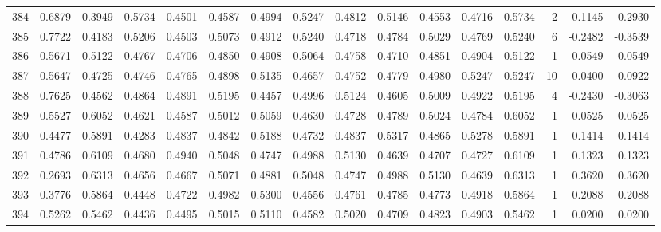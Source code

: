 \begin{tabular}{lrrrrrrrrrrrrrrr}
384 &      0.6879 &  0.3949 &  0.5734 &  0.4501 &  0.4587 &  0.4994 &  0.5247 &  0.4812 &  0.5146 &  0.4553 &   0.4716 &     0.5734 &      2 &                   -0.1145 &                    -0.2930 \\
385 &      0.7722 &  0.4183 &  0.5206 &  0.4503 &  0.5073 &  0.4912 &  0.5240 &  0.4718 &  0.4784 &  0.5029 &   0.4769 &     0.5240 &      6 &                   -0.2482 &                    -0.3539 \\
386 &      0.5671 &  0.5122 &  0.4767 &  0.4706 &  0.4850 &  0.4908 &  0.5064 &  0.4758 &  0.4710 &  0.4851 &   0.4904 &     0.5122 &      1 &                   -0.0549 &                    -0.0549 \\
387 &      0.5647 &  0.4725 &  0.4746 &  0.4765 &  0.4898 &  0.5135 &  0.4657 &  0.4752 &  0.4779 &  0.4980 &   0.5247 &     0.5247 &     10 &                   -0.0400 &                    -0.0922 \\
388 &      0.7625 &  0.4562 &  0.4864 &  0.4891 &  0.5195 &  0.4457 &  0.4996 &  0.5124 &  0.4605 &  0.5009 &   0.4922 &     0.5195 &      4 &                   -0.2430 &                    -0.3063 \\
389 &      0.5527 &  0.6052 &  0.4621 &  0.4587 &  0.5012 &  0.5059 &  0.4630 &  0.4728 &  0.4789 &  0.5024 &   0.4784 &     0.6052 &      1 &                    0.0525 &                     0.0525 \\
390 &      0.4477 &  0.5891 &  0.4283 &  0.4837 &  0.4842 &  0.5188 &  0.4732 &  0.4837 &  0.5317 &  0.4865 &   0.5278 &     0.5891 &      1 &                    0.1414 &                     0.1414 \\
391 &      0.4786 &  0.6109 &  0.4680 &  0.4940 &  0.5048 &  0.4747 &  0.4988 &  0.5130 &  0.4639 &  0.4707 &   0.4727 &     0.6109 &      1 &                    0.1323 &                     0.1323 \\
392 &      0.2693 &  0.6313 &  0.4656 &  0.4667 &  0.5071 &  0.4881 &  0.5048 &  0.4747 &  0.4988 &  0.5130 &   0.4639 &     0.6313 &      1 &                    0.3620 &                     0.3620 \\
393 &      0.3776 &  0.5864 &  0.4448 &  0.4722 &  0.4982 &  0.5300 &  0.4556 &  0.4761 &  0.4785 &  0.4773 &   0.4918 &     0.5864 &      1 &                    0.2088 &                     0.2088 \\
394 &      0.5262 &  0.5462 &  0.4436 &  0.4495 &  0.5015 &  0.5110 &  0.4582 &  0.5020 &  0.4709 &  0.4823 &   0.4903 &     0.5462 &      1 &                    0.0200 &                     0.0200 \\

\end{tabular}
